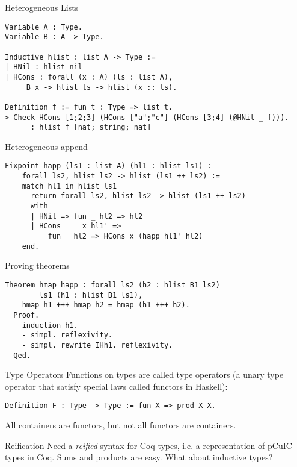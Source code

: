 \documentclass{beamer}
\begin{document}
\begin{frame}[fragile]{Heterogeneous Lists}
\begin{verbatim}
Variable A : Type.
Variable B : A -> Type.

Inductive hlist : list A -> Type :=
| HNil : hlist nil
| HCons : forall (x : A) (ls : list A),
	 B x -> hlist ls -> hlist (x :: ls). 	

Definition f := fun t : Type => list t.
> Check HCons [1;2;3] (HCons ["a";"c"] (HCons [3;4] (@HNil _ f))).
      : hlist f [nat; string; nat]
\end{verbatim}
\end{frame}

\begin{frame}[fragile]{Heterogeneous append}
\begin{verbatim}
Fixpoint happ (ls1 : list A) (hl1 : hlist ls1) : 
	forall ls2, hlist ls2 -> hlist (ls1 ++ ls2) :=
    match hl1 in hlist ls1 
      return forall ls2, hlist ls2 -> hlist (ls1 ++ ls2)
	  with
      | HNil => fun _ hl2 => hl2
      | HCons _ _ x hl1' => 
          fun _ hl2 => HCons x (happ hl1' hl2)
    end.
\end{verbatim}
\end{frame}

\begin{frame}[fragile]{Proving theorems}
\begin{verbatim}
Theorem hmap_happ : forall ls2 (h2 : hlist B1 ls2) 
		ls1 (h1 : hlist B1 ls1),
    hmap h1 +++ hmap h2 = hmap (h1 +++ h2).
  Proof.
    induction h1. 
    - simpl. reflexivity.
    - simpl. rewrite IHh1. reflexivity.
  Qed.
\end{verbatim}
\end{frame}

\begin{frame}[fragile]{Type Operators}
Functions on types are called type operators (a unary type operator that satisfy special laws called functors in Haskell): 
\begin{verbatim}
Definition F : Type -> Type := fun X => prod X X.
\end{verbatim}
All containers are functors, but not all functors are containers. 
\end{frame}

\begin{frame}[fragile]{Reification}
Need a \emph{reified} syntax for Coq types, i.e. a representation of pCuIC types in Coq. 
Sums and products are easy. What about inductive types? 
\end{frame}
\end{document}

